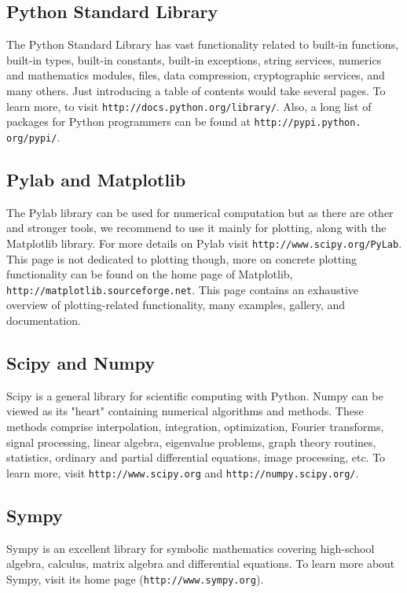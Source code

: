 \subsection{Python Standard Library}

The Python Standard Library has vast functionality related to 
built-in functions, built-in types, built-in constants, built-in
exceptions, string services, numerics and mathematics modules, files,
data compression, cryptographic services, and many others. Just introducing 
a table of contents would take several pages. To learn more,
to visit {\tt http://docs.python.org/library/}. Also, a long list of packages for Python 
programmers can be found at {\tt http://pypi.python. org/pypi/}.

\subsection{Pylab and Matplotlib}

The Pylab library can be used for numerical computation but as there are other 
and stronger tools, we recommend to use it mainly for plotting, along with the 
Matplotlib library. For more details on Pylab visit {\tt http://www.scipy.org/PyLab}.
This page is not dedicated to plotting though, more on concrete plotting functionality 
can be found on the home page of Matplotlib, {\tt http://matplotlib.sourceforge.net}.
This page contains an exhaustive overview of plotting-related functionality, many
examples, gallery, and documentation.

\subsection{Scipy and Numpy}

Scipy is a general library for scientific computing with 
Python. Numpy can be viewed as its "heart" containing numerical 
algorithms and methods. These methods comprise interpolation, 
integration, optimization, Fourier transforms, signal processing, 
linear algebra, eigenvalue problems, graph theory routines,
statistics, ordinary and partial differential equations,
image processing, etc. To learn more, visit 
{\tt http://www.scipy.org} and {\tt http://numpy.scipy.org/}. 

\subsection{Sympy}

Sympy is an excellent library for symbolic mathematics covering high-school 
algebra, calculus, matrix algebra and differential equations. To learn more
about Sympy, visit its home page ({\tt http://www.sympy.org}).

